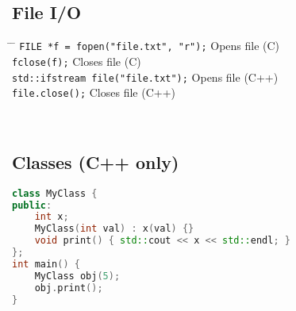 \documentclass[a4paper,10pt]{article}
\begin{document}
\subsection{File I/O}
\begin{tabbing}
	\= \hspace{30mm} \= \hspace{50mm} \kill
	\> \verb|FILE *f = fopen("file.txt", "r");| \> Opens file (C) \\
	\> \verb|fclose(f);| \> Closes file (C) \\
	\> \verb|std::ifstream file("file.txt");| \> Opens file (C++) \\
	\> \verb|file.close();| \> Closes file (C++) \\
\end{tabbing}\

\subsection{Classes (C++ only)}
\begin{lstlisting}[language=C++]
class MyClass {
public:
    int x;
    MyClass(int val) : x(val) {}
    void print() { std::cout << x << std::endl; }
};
int main() {
    MyClass obj(5);
    obj.print();
}
\end{lstlisting}
\end{document}
